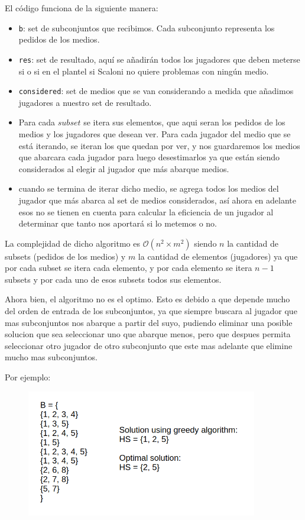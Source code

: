 El código funciona de la siguiente manera:
\begin{itemize}
    \item \texttt{b}: set de subconjuntos que recibimos. Cada subconjunto representa los pedidos de los medios.
    \item \texttt{res}: set de resultado, aquí se añadirán todos los jugadores que deben meterse si o si en el plantel si Scaloni no quiere problemas con ningún medio.
    \item \texttt{considered}: set de medios que se van considerando a medida que añadimos jugadores a nuestro set de resultado.
    \item Para cada $subset$ se itera sus elementos, que aqui seran los pedidos de los medios y los jugadores que desean ver. Para cada jugador del medio que se está iterando, se iteran los que quedan por ver, y nos guardaremos los medios que abarcara cada jugador para luego desestimarlos ya que están siendo considerados al elegir al jugador que más abarque medios.
    \item cuando se termina de iterar dicho medio, se agrega todos los medios del jugador que más abarca al set de medios considerados, así ahora en adelante esos no se tienen en cuenta para calcular la eficiencia de un jugador al determinar que tanto nos aportará si lo metemos o no.
\end{itemize}

La complejidad de dicho algoritmo es $\mathcal{O}\left(n^2 \times m^2\right)$ siendo $n$ la cantidad de subsets (pedidos de los medios) y $m$ la cantidad de elementos (jugadores) ya que por cada subset se itera cada elemento, y por cada elemento se itera $n-1$ subsets y por cada uno de esos subsets todos sus elementos.

Ahora bien, el algoritmo no es el optimo. Esto es debido a que depende mucho del orden de entrada de los subconjuntos, ya que siempre buscara al jugador que mas subconjuntos nos abarque a partir del suyo, pudiendo eliminar una posible solucion que sea seleccionar uno que abarque menos, pero que despues permita seleccionar otro jugador de otro subconjunto que este mas adelante que elimine mucho mas subconjuntos.

Por ejemplo:

\begin{figure}[H]
	\centering
	\includegraphics[width=0.9\textwidth]{img/greedyCmp.png}
\end{figure}